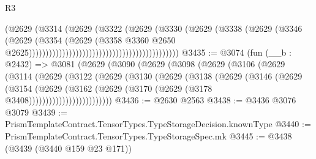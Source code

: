 \begin{lexlean}{R3}
\begin{coremodule}
                                                                  (@2629
                                                                    (@3314
                                                                      (@2629
                                                                        (@3322
                                                                          (@2629
                                                                            (@3330
                                                                              (@2629
                                                                                (@3338
                                                                                  (@2629
                                                                                    (@3346
                                                                                      (@2629
                                                                                        (@3354
                                                                                          (@2629
                                                                                            (@3358
                                                                                              @3360
                                                                                              @2650
                                                                                              @2625)))))))))))))))))))))))))))))))))))))))))))))
@3435 := @3074
    (fun (__b : @2432) =>
    @3081
      (@2629
        (@3090
          (@2629
            (@3098
              (@2629
                (@3106
                  (@2629
                    (@3114
                      (@2629
                        (@3122
                          (@2629
                            (@3130
                              (@2629
                                (@3138
                                  (@2629
                                    (@3146
                                      (@2629
                                        (@3154
                                          (@2629
                                            (@3162
                                              (@2629
                                                (@3170 (@2629 (@3178 @3408)))))))))))))))))))))))))
@3436 := @2630 @2563
@3438 := @3436 @3076 @3079
@3439 := PrismTemplateContract.TensorTypes.TypeStorageDecision.knownType
@3440 := PrismTemplateContract.TensorTypes.TypeStorageSpec.mk
@3445 := @3438 (@3439 (@3440 @159 @23 @171))

\end{coremodule}
\end{lexlean}
